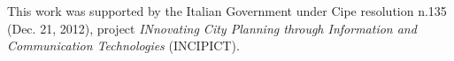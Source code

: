 \begin{acknowledgements}

This work was supported by the Italian Government under Cipe resolution n.135 (Dec. 21, 2012), project \emph{INnovating City Planning through Information and Communication Technologies} (INCIPICT).

\end{acknowledgements}